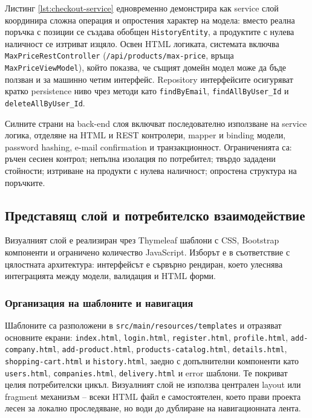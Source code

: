 Листинг \ref{lst:checkout-service} едновременно демонстрира как service слой координира сложна операция и опростения характер на модела: вместо реална поръчка с позиции се създава обобщен \texttt{HistoryEntity}, а продуктите с нулева наличност се изтриват изцяло. Освен HTML логиката, системата включва \texttt{MaxPriceRestController} (\texttt{/api/products/max-price}, връща \texttt{MaxPriceViewModel}), който показва, че същият домейн модел може да бъде ползван и за машинно четим интерфейс. Repository интерфейсите осигуряват кратко persistence ниво чрез методи като \texttt{findByEmail}, \texttt{findAllByUser\_Id} и \texttt{deleteAllByUser\_Id}.

Силните страни на back-end слоя включват последователно използване на service логика, отделяне на HTML и REST контролери, mapper и binding модели, password hashing, e-mail confirmation и транзакционност. Ограниченията са: ръчен сесиен контрол; непълна изолация по потребител; твърдо зададени стойности; изтриване на продукти с нулева наличност; опростена структура на поръчките.

\subsection{Представящ слой и потребителско взаимодействие}

Визуалният слой е реализиран чрез Thymeleaf шаблони с CSS, Bootstrap компоненти и ограничено количество JavaScript. Изборът е в съответствие с цялостната архитектура: интерфейсът е сървърно рендиран, което улеснява интеграцията между модели, валидация и HTML форми.

\subsubsection{Организация на шаблоните и навигация}

Шаблоните са разположени в \texttt{src/main/resources/templates} и отразяват основните екрани: \texttt{index.html}, \texttt{login.html}, \texttt{register.html}, \texttt{profile.html}, \texttt{add-company.html}, \texttt{add-product.html}, \texttt{products-catalog.html}, \texttt{details.html}, \texttt{shopping-cart.html} и \texttt{history.html}, заедно с допълнителни компоненти като \texttt{users.html}, \texttt{companies.html}, \texttt{delivery.html} и error шаблони. Те покриват целия потребителски цикъл. Визуалният слой не използва централен layout или fragment механизъм -- всеки HTML файл е самостоятелен, което прави проекта лесен за локално проследяване, но води до дублиране на навигационната лента.

